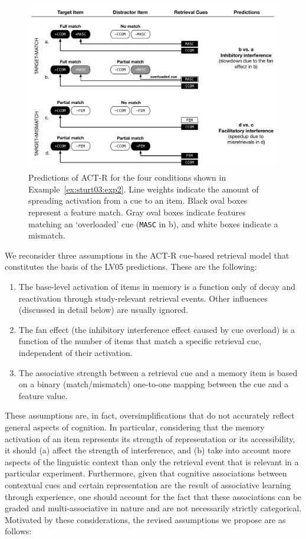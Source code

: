 \documentclass{cambridge7A}\usepackage[]{graphicx}\usepackage[]{color}
\newcommand{\actrcue}[1]{\texttt{\uppercase{#1}}}
\begin{document}
\begin{figure}[!htbp]
\includegraphics[width=\textwidth]{figures/tableLV05pred}
    \caption{Predictions of ACT-R for the four conditions shown in Example~\ref{ex:sturt03:exp2}. Line weights indicate the amount of spreading activation from a cue to an item. Black oval boxes represent a feature match. Gray oval boxes indicate features matching an `overloaded' cue (\actrcue{MASC} in b), and white boxes indicate a mismatch.} \label{fig:ACTRpred}
\end{figure}

We reconsider three assumptions in the ACT-R cue-based retrieval model that constitutes the basis of the LV05 predictions. These are the following:

\begin{enumerate}
  \item The base-level activation of items in memory is a function only of decay and reactivation through study-relevant retrieval events. Other influences (discussed in detail below) are usually ignored.
  \item The fan effect (the inhibitory interference effect caused by cue overload) is a function of the number of items that match a specific retrieval cue, independent of their activation.
  \item The associative strength between a retrieval cue and a memory item is based on a binary (match/mismatch) one-to-one mapping between the cue and a feature value.
\end{enumerate}

These assumptions are, in fact, oversimplifications that do not accurately reflect general aspects of cognition. 
In particular, considering that the memory activation of an item represents its strength of representation or its accessibility, it should (a) affect the strength of interference, and (b) take into account more aspects of the linguistic context than only the retrieval event that is relevant in a particular experiment. 
Furthermore, given that cognitive associations between contextual cues and certain representation are the result of associative learning through experience, 
one should account for the fact that these associations can be graded and multi-associative in nature and are not necessarily strictly categorical.
Motivated by these considerations, the revised assumptions we propose are as follows:
\end{document}
